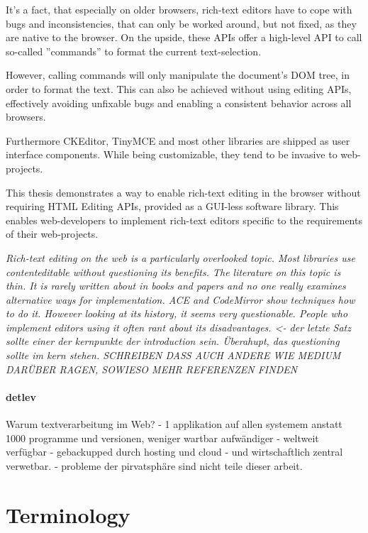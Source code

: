 It's a fact, that especially on older browsers, rich-text editors have to cope with bugs and inconsistencies, that can only be worked around, but not fixed, as they are native to the browser. On the upside, these APIs offer a high-level API to call so-called ''commands'' to format the current text-selection. 

However, calling commands will only manipulate the document's DOM tree, in order to format the text. This can also be achieved without using editing APIs, effectively avoiding unfixable bugs and enabling a consistent behavior across all browsers.

Furthermore CKEditor, TinyMCE and most other libraries are shipped as user interface components. While being customizable, they tend to be invasive to web-projects.

This thesis demonstrates a way to enable rich-text editing in the browser without requiring HTML Editing APIs, provided as a GUI-less software library. This enables web-developers to implement rich-text editors specific to the requirements of their web-projects.

\textit{Rich-text editing on the web is a particularly overlooked topic. Most libraries use contenteditable without questioning its benefits. The literature on this topic is thin. It is rarely written about in books and papers and no one really examines alternative ways for implementation. ACE and CodeMirror show techniques how to do it. However looking at its history, it seems very questionable. People who implement editors using it often rant about its disadvantages. <- der letzte Satz sollte einer der kernpunkte der introduction sein. Überahupt, das questioning sollte im kern stehen. SCHREIBEN DASS AUCH ANDERE WIE MEDIUM DARÜBER RAGEN, SOWIESO MEHR REFERENZEN FINDEN}

\paragraph{detlev} Warum textverarbeitung im Web? - 1 applikation auf allen systemem anstatt 1000 programme und versionen, weniger wartbar aufwändiger - weltweit verfügbar - gebackupped durch hosting und cloud - und wirtschaftlich zentral verwetbar. - probleme der pirvatsphäre sind nicht teile dieser arbeit.

\section{Terminology}


